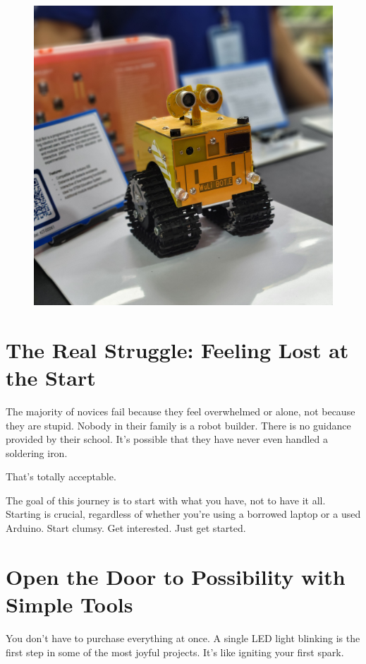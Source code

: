\documentclass[a4paper,10pt,twocolumn]{memoir}
\begin{document}
\begin{figure}[ht]
  \centering
  \includegraphics[width=\columnwidth]{spider.jpg}
  \caption*{}
  \label{fig2}
\end{figure}

\section*{The Real Struggle: Feeling Lost at the Start}
The majority of novices fail because they feel overwhelmed or alone, not because they are stupid. Nobody in their family is a robot builder. There is no guidance provided by their school. It’s possible that they have never even handled a soldering iron.

That’s totally acceptable.

The goal of this journey is to start with what you have, not to have it all. Starting is crucial, regardless of whether you’re using a borrowed laptop or a used Arduino. Start clumsy. Get interested. Just get started.
\section*{Open the Door to Possibility with Simple Tools}
You don’t have to purchase everything at once. A single LED light blinking is the first step in some of the most joyful projects. It’s like igniting your first spark.
\end{document}
